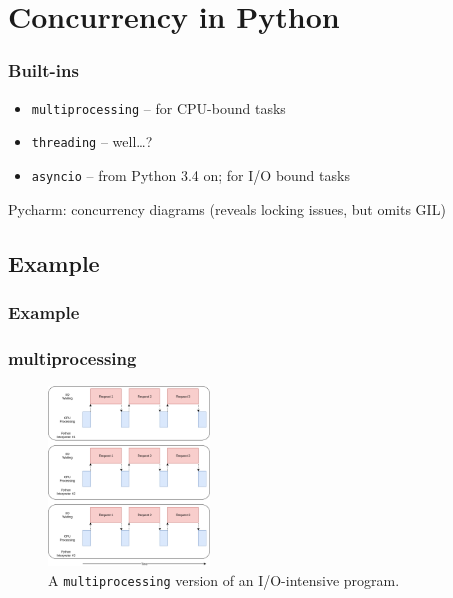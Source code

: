 \documentclass{beamer}
\begin{document}
    \section{Concurrency in Python}

    \begin{frame}
        \frametitle{Built-ins}

        \begin{itemize}
            \item \texttt{multiprocessing} -- for CPU-bound tasks
            \item \texttt{threading}  -- well\dots?
            \item \texttt{asyncio} -- from Python 3.4 on; for I/O bound tasks
        \end{itemize}

        Pycharm: concurrency diagrams (reveals locking issues, but omits GIL)

    \end{frame}

    \subsection{Example}

    \begin{frame}
        \frametitle{Example}



    \end{frame}

    \begin{frame}
        \frametitle{multiprocessing}

        \begin{figure}
            \includegraphics[height=180px]{../figures/MProc.png}
            \caption{A \texttt{multiprocessing} version of an I/O-intensive program.}
        \end{figure}

    \end{frame}
\end{document}
